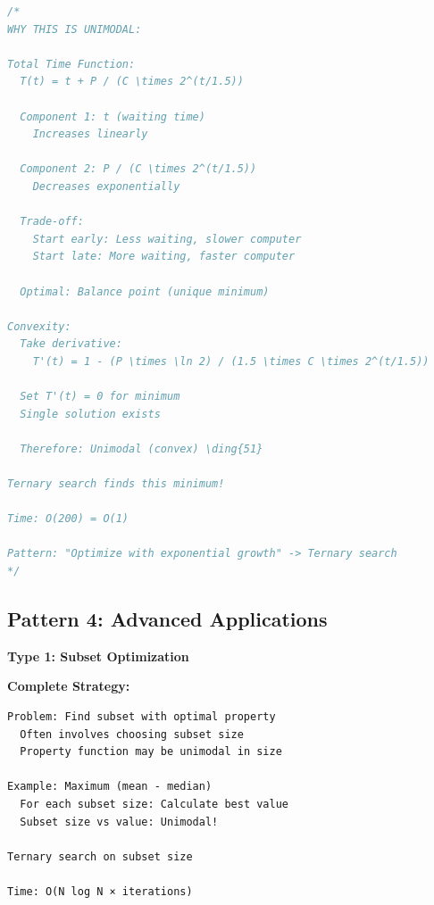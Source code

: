 \documentclass[11pt,a4paper,oneside]{book}
\begin{document}
\begin{lstlisting}[language=C++, caption=Complete Discrete Solutions - NEW PROBLEM]
/*
WHY THIS IS UNIMODAL:

Total Time Function:
  T(t) = t + P / (C \times 2^(t/1.5))
  
  Component 1: t (waiting time)
    Increases linearly
  
  Component 2: P / (C \times 2^(t/1.5))
    Decreases exponentially
  
  Trade-off:
    Start early: Less waiting, slower computer
    Start late: More waiting, faster computer
  
  Optimal: Balance point (unique minimum)

Convexity:
  Take derivative:
    T'(t) = 1 - (P \times \ln 2) / (1.5 \times C \times 2^(t/1.5))
  
  Set T'(t) = 0 for minimum
  Single solution exists
  
  Therefore: Unimodal (convex) \ding{51}

Ternary search finds this minimum!

Time: O(200) = O(1)

Pattern: "Optimize with exponential growth" -> Ternary search
*/
\end{lstlisting}

\subsection{Pattern 4: Advanced Applications}

\begin{tcolorbox}[
    enhanced,breakable,
    colback=dangered!10,
    colframe=dangered,
    boxrule=2pt,
    arc=4mm,
    title=\textbf{Complete Advanced Algorithms}
]
\textbf{Type 1: Subset Optimization}

\textbf{Complete Strategy:}
\begin{verbatim}
Problem: Find subset with optimal property
  Often involves choosing subset size
  Property function may be unimodal in size
  
Example: Maximum (mean - median)
  For each subset size: Calculate best value
  Subset size vs value: Unimodal!
  
Ternary search on subset size

Time: O(N log N × iterations)
\end{verbatim}
\end{tcolorbox}
\end{document}
